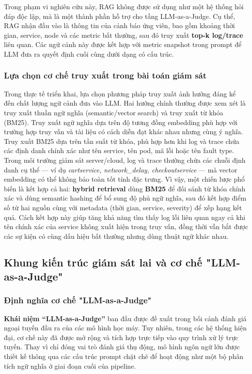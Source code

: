 Trong phạm vi nghiên cứu này, RAG không được sử dụng như một hệ thống hỏi đáp độc lập, mà là một thành phần hỗ trợ cho tầng LLM-as-a-Judge. Cụ thể, RAG nhận đầu vào là thông tin của cảnh báo ứng viên, bao gồm khoảng thời gian, service, node và các metric bất thường, sau đó truy xuất \textbf{top-k log/trace} liên quan. Các ngữ cảnh này được kết hợp với metric snapshot trong prompt để LLM đưa ra quyết định cuối cùng dưới dạng có cấu trúc.
\subsubsection*{Lựa chọn cơ chế truy xuất trong bài toán giám sát}
Trong thực tế triển khai, lựa chọn phương pháp truy xuất ảnh hưởng đáng kể đến chất lượng ngữ cảnh đưa vào LLM. Hai hướng chính thường được xem xét là truy xuất thuần ngữ nghĩa (semantic/vector search) và truy xuất từ khóa (BM25). Truy xuất ngữ nghĩa dựa trên độ tương đồng embedding phù hợp với trường hợp truy vấn và tài liệu có cách diễn đạt khác nhau nhưng cùng ý nghĩa. Truy xuất BM25 dựa trên tần suất từ khóa, phù hợp hơn khi log và trace chứa các định danh chính xác như tên service, tên pod, mã lỗi hoặc tên fault type.
Trong môi trường giám sát server/cloud, log và trace thường chứa các chuỗi định danh cụ thể — ví dụ \textit{cartservice, network\_delay, checkoutservice} — mà vector embedding có thể không bảo toàn tốt tính đặc trưng. Vì vậy, một chiến lược phổ biến là kết hợp cả hai: \textbf{hybrid retrieval} dùng \textbf{BM25} để đối sánh từ khóa chính xác và dùng semantic hashing để bổ sung độ phủ ngữ nghĩa, sau đó kết hợp điểm số từ hai nguồn cùng với metadata (thời gian, service, severity) để xếp hạng kết quả. Cách kết hợp này giúp tăng khả năng tìm thấy log lỗi liên quan ngay cả khi tên chính xác của service không xuất hiện trong truy vấn, đồng thời vẫn bắt được các sự kiện có cùng dấu hiệu bất thường nhưng dùng thuật ngữ khác nhau.
\subsection{Khung kiến trúc giám sát lai và cơ chế "LLM-as-a-Judge"}
\subsubsection{Định nghĩa cơ chế "LLM-as-a-Judge"}
\textbf{Khái niệm “LLM-as-a-Judge”} ban đầu được đề xuất trong bối cảnh đánh giá ngoại tuyến đầu ra của các mô hình học máy. Tuy nhiên, trong các hệ thống hiện đại, cơ chế này đã được mở rộng và tích hợp trực tiếp vào quy trình xử lý trực tuyến. Thay vì chỉ đóng vai trò đánh giá thụ động, mô hình ngôn ngữ lớn được thiết kế thông qua các cấu trúc prompt chặt chẽ để hoạt động như một bộ phân tích ngữ nghĩa ở giai đoạn cuối của pipeline.

